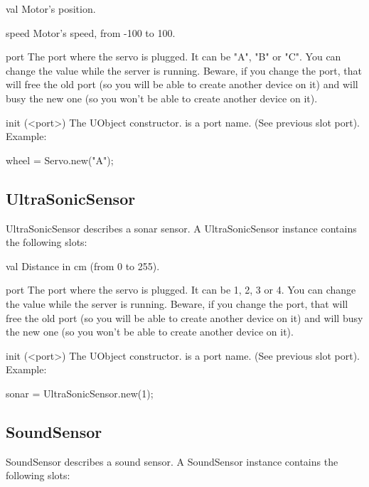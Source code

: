 \begin{urbiscriptapi}
\item[val] Motor's position.

\item[speed] Motor's speed, from -100 to 100.

\item[port] The port where the servo is plugged. It can be "A", "B" or
  "C". You can change the value while the server is running. Beware, if you
  change the port, that will free the old port (so you will be able to
  create another device on it) and will busy the new one (so you won't be
  able to create another device on it).

\item[init](<port>) The UObject constructor.  is a port name. (See
  previous slot port). Example:
\begin{urbiunchecked}
wheel = Servo.new("A");
\end{urbiunchecked}
\end{urbiscriptapi}


\subsection{UltraSonicSensor}
UltraSonicSensor describes a sonar sensor. A UltraSonicSensor instance
contains the following slots:

\begin{urbiscriptapi}
\item[val] Distance in cm (from 0 to 255).

\item[port] The port where the servo is plugged. It can be 1, 2, 3 or 4. You
  can change the value while the server is running. Beware, if you change
  the port, that will free the old port (so you will be able to create
  another device on it) and will busy the new one (so you won't be able to
  create another device on it).

\item[init](<port>) The UObject constructor.  is a port name. (See
  previous slot port). Example:
\begin{urbiunchecked}
sonar = UltraSonicSensor.new(1);
\end{urbiunchecked}

\end{urbiscriptapi}

\subsection{SoundSensor}
SoundSensor describes a sound sensor. A SoundSensor instance contains the
following slots:

